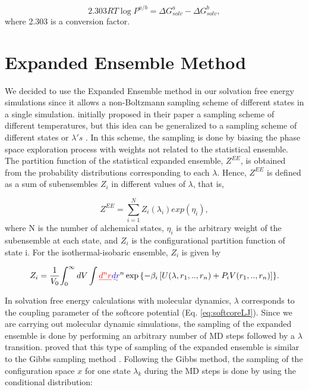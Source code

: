 \documentclass[
	12pt,				%
	openany,			%
	oneside,			%
	a4paper,			%
	english,			%
	brazil				%
	]{abntex2}
\providecommand{\DIFadd}[1]{{\protect\color{blue}\uwave{#1}}}
\providecommand{\DIFdel}[1]{{\protect\color{red}\sout{#1}}}
\providecommand{\DIFaddbegin}{}
\providecommand{\DIFaddend}{}
\providecommand{\DIFdelbegin}{}
\providecommand{\DIFdelend}{}
\providecommand{\DIFadd}[1]{{\protect\color{blue}\uwave{#1}}} %
\providecommand{\DIFdel}[1]{{\protect\color{red}\sout{#1}}}                      %
\providecommand{\DIFaddbegin}{} %
\providecommand{\DIFaddend}{} %
\providecommand{\DIFdelbegin}{} %
\providecommand{\DIFdelend}{} %
\begin{document}
\begin{equation}
\label{eqn:partcoe}
{2.303RT} \log{P}^{a/b} ={\Delta G_{solv}^{a} - \Delta G_{solv}^{b}},
\end{equation}
where 2.303 is a conversion factor.

\section{Expanded Ensemble Method}\label{ee}

We decided to use the Expanded Ensemble method \cite{lyubartsev} in our solvation free energy simulations since it allows a non-Boltzmann sampling scheme of different states in a single simulation.  initially proposed in their paper a sampling scheme of different temperatures, but this idea can be generalized to a sampling scheme of different states or $\lambda 's$ \cite{escobedo2007}. In this scheme, the sampling is done by biasing the phase space exploration process with weights not related to the statistical ensemble. The partition function of the statistical expanded ensemble, $Z^{EE}$, is obtained from the probability distributions corresponding to each $\lambda$. Hence, $Z^{EE}$ is defined as a sum of subensembles $Z_{i}$ in different values of $\lambda$, that is,

\begin{equation}
Z^{EE} = \sum_{i=1}^{N} Z_{i}(\lambda_{i}) exp(\eta_{i}),
\label{eqn:ee}
\end{equation}   
where N is the number of alchemical states, $\eta_{i}$ is the arbitrary weight of the subensemble at each state, and $Z_{i}$ is the configurational partition function of state i. For the isothermal-isobaric ensemble, $Z_{i}$ is given by

\begin{equation}
Z_{i} = \frac{1}{V_{0}} {\int_{0}^{\infty} dV \int \DIFdelbegin \DIFdel{d^{n}r}\DIFdelend \DIFaddbegin \DIFadd{dr}\DIFaddend ^{n} \exp \left \lbrace -\beta_{i} \left[ U(\lambda, r_{1},..,r_{n}) + P_{i}V(r_{1},..,r_{n}) \right] \right \rbrace}.
\end{equation} 

In solvation free energy calculations with molecular dynamics, $\lambda$ corresponds to the coupling parameter of the softcore potential (Eq. \ref{eq:softcoreLJ}). Since we are carrying out molecular dynamic simulations, the sampling of the expanded ensemble is done by performing an arbitrary number of MD  steps followed by a $\lambda$ transition.  proved that this type of sampling of the expanded ensemble is similar to the Gibbs sampling method \cite{geman1984,liu2002}. Following the Gibbs method, the sampling of the configuration space $x$ for one state $\lambda_{k}$ during the MD steps is done by using the conditional distribution:
\end{document}
